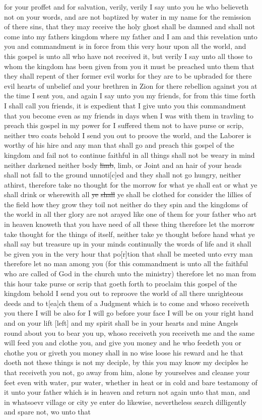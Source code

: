 for your proffet and for salvation, verily, verily I say unto you he who believeth not on your words, and are not baptized by water in my name for the remission of there sins, that they may receive the holy ghost shall be damned and shall not come into my fathers kingdom where my father and I am and this revelation unto you and commandment is in force from this very hour upon all the world, and this gospel is unto all who have not received it, but verily I say unto all those to whom the kingdom has been given from you it must be preached unto them that they shall repent of ther former evil works for they are to be upbraded for there evil hearts of unbelief and your brethren in Zion for there rebellion against you at the time I sent you, and again I say unto you my friends, for from this time forth I shall call you friends, it is expedient that I give unto you this commandment that you become even as my friends in days when I was with them in travling to preach this gospel in my power for I suffered them not to have purse or scrip, neither two coats behold I send you out to proove the world, and the Laborer is worthy of his hire and any man that shall go and preach this gospel of the kingdom and fail not to continue faithful in all things shall not be weary in mind neither darkened neither body \sout{limb}, limb, or Joint and an hair of your heads shall not fall to the ground unnoti[c]ed and they shall not go hungry, neither athirst, therefore take no thought for the morrow for what ye shall eat or what ye shall drink or wherewith all \sout{ye} \sout{shall} ye shall be clothed for consider the lillies of the field how they grow they toil not neither do they spin and the kingdoms of the world in all ther glory are not arayed like one of them for your father who art in heaven knoweth that you have need of all these thing therefore let the morrow take thought for the things of itself, neither take ye thought before hand what ye shall say but treasure up in your minds continually the words of life and it shall be given you in the very hour that po[r]tion that shall be meeted unto evry man therefore let no man among you (for this commandment is unto all the faithful who are called of God in the church unto the ministry) therefore let no man from this hour take purse or scrip that goeth forth to proclaim this gospel of the kingdom behold I send you out to reproove the world of all there unrighteous deeds and to t[ea]ch them of a Judgment which is to come and whoso receiveth you there I will be also for I will go before your face I will be on your right hand and on your lift [left] and my spirit shall be in your hearts and mine Angels round about you to bear you up, whoso receiveth you receiveth me and the same will feed you and clothe you, and give you money and he who feedeth you or chothe you or giveth you money shall in no wise loose his reward and he that doeth not these things is not my deciple, by this you may know my deciples he that receiveth you not, go away from him, alone by yourselves and cleanse your feet even with water, pur water, whether in heat or in cold and bare testamony of it unto your father which is in heaven and return not again unto that man, and in whatsoevr village or city ye enter do likewise, nevertheless search dilligently and spare not, wo unto that 